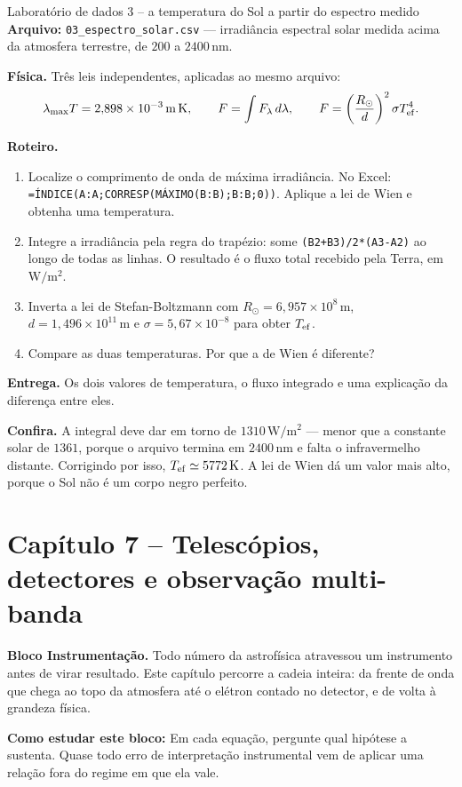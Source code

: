 \documentclass[11pt,a4paper]{article}
\newcommand{\aberturabloco}[3]{%
  \begin{noticebox}
  \textbf{Bloco #1.} #2

  \textbf{Como estudar este bloco:} #3
  \end{noticebox}
}
\begin{document}
\begin{lessonblock}[borderline west={2pt}{0pt}{astroGold}]{Laboratório de dados 3 -- a temperatura do Sol a partir do espectro medido}
\textbf{Arquivo:} \texttt{03\_espectro\_solar.csv} --- irradiância espectral solar medida acima da atmosfera terrestre, de $200$ a $2400\,\mathrm{nm}$.

\textbf{Física.} Três leis independentes, aplicadas ao mesmo arquivo:
\[
\lambda_{\max}T=2{,}898\times10^{-3}\,\mathrm{m\,K},\qquad
F=\int F_\lambda\,d\lambda,\qquad
F=\left(\frac{R_\odot}{d}\right)^{2}\sigma T_{\rm ef}^{4}.
\]

\textbf{Roteiro.}
\begin{enumerate}
\item Localize o comprimento de onda de máxima irradiância. No Excel: \texttt{=ÍNDICE(A:A;CORRESP(MÁXIMO(B:B);B:B;0))}. Aplique a lei de Wien e obtenha uma temperatura.
\item Integre a irradiância pela regra do trapézio: some \texttt{(B2+B3)/2*(A3-A2)} ao longo de todas as linhas. O resultado é o fluxo total recebido pela Terra, em $\mathrm{W/m^2}$.
\item Inverta a lei de Stefan-Boltzmann com $R_\odot=6{,}957\times10^{8}\,\mathrm{m}$, $d=1{,}496\times10^{11}\,\mathrm{m}$ e $\sigma=5{,}67\times10^{-8}$ para obter $T_{\rm ef}$.
\item Compare as duas temperaturas. Por que a de Wien é diferente?
\end{enumerate}

\textbf{Entrega.} Os dois valores de temperatura, o fluxo integrado e uma explicação da diferença entre eles.

\textbf{Confira.} A integral deve dar em torno de $1310\,\mathrm{W/m^2}$ --- menor que a constante solar de $1361$, porque o arquivo termina em $2400\,\mathrm{nm}$ e falta o infravermelho distante. Corrigindo por isso, $T_{\rm ef}\simeq5772\,\mathrm{K}$. A lei de Wien dá um valor mais alto, porque o Sol não é um corpo negro perfeito.
\end{lessonblock}

\newpage
\section*{Capítulo 7 -- Telescópios, detectores e observação multi-banda}
\aberturabloco{Instrumentação}{Todo número da astrofísica atravessou um instrumento antes de virar resultado. Este capítulo percorre a cadeia inteira: da frente de onda que chega ao topo da atmosfera até o elétron contado no detector, e de volta à grandeza física.}{Em cada equação, pergunte qual hipótese a sustenta. Quase todo erro de interpretação instrumental vem de aplicar uma relação fora do regime em que ela vale.}
\end{document}
